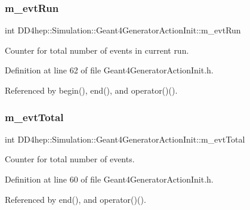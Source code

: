 \subsubsection{\texorpdfstring{m\+\_\+evt\+Run}{m\_evtRun}}
{\footnotesize\ttfamily int D\+D4hep\+::\+Simulation\+::\+Geant4\+Generator\+Action\+Init\+::m\+\_\+evt\+Run\hspace{0.3cm}{\ttfamily [protected]}}



Counter for total number of events in current run. 



Definition at line 62 of file Geant4\+Generator\+Action\+Init.\+h.



Referenced by begin(), end(), and operator()().

\hypertarget{class_d_d4hep_1_1_simulation_1_1_geant4_generator_action_init_a88579a131b4e22fa0b05f87fe1a8276c}{}\label{class_d_d4hep_1_1_simulation_1_1_geant4_generator_action_init_a88579a131b4e22fa0b05f87fe1a8276c} 
\subsubsection{\texorpdfstring{m\+\_\+evt\+Total}{m\_evtTotal}}
{\footnotesize\ttfamily int D\+D4hep\+::\+Simulation\+::\+Geant4\+Generator\+Action\+Init\+::m\+\_\+evt\+Total\hspace{0.3cm}{\ttfamily [protected]}}



Counter for total number of events. 



Definition at line 60 of file Geant4\+Generator\+Action\+Init.\+h.



Referenced by end(), and operator()().

\hypertarget{class_d_d4hep_1_1_simulation_1_1_geant4_generator_action_init_a251d29e869dd2401e208f39176cb6fe1}{}\label{class_d_d4hep_1_1_simulation_1_1_geant4_generator_action_init_a251d29e869dd2401e208f39176cb6fe1} 
